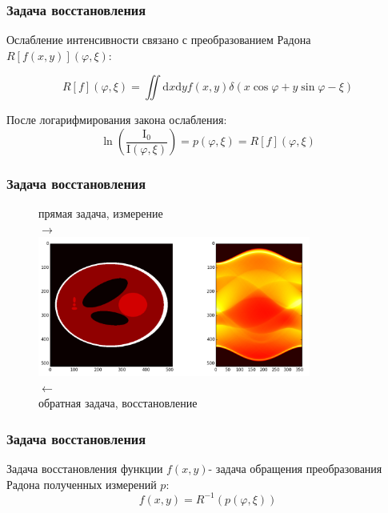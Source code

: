 \documentclass[12pt]{beamer}
\begin{document}
\begin{frame}
\frametitle{Задача восстановления}
  Ослабление интенсивности связано с преобразованием Радона $R[f(x,y)](\varphi, \xi)$:

  $$
  R[f](\varphi, \xi) = 
 \iint \! \mathrm d x \mathrm d y f(x,y)\delta(x\cos\varphi + y\sin\varphi - \xi)
  $$


  После логарифмирования закона ослабления:
  $$
  \ln \left (\frac{\mathrm I_0}{\mathrm I(\varphi, \xi)} \right) = p(\varphi, \xi) = R[f](\varphi, \xi)
  $$

\end{frame}

\begin{frame}
\frametitle{Задача восстановления}
\begin{figure}
\centering
    прямая задача, измерение\\
    $\rightarrow$
    \\
    \includegraphics[width=0.8\textwidth]{sl_sinogram}
    \\
    $\leftarrow$ \\
    обратная задача, восстановление
\end{figure}
\end{frame}

\begin{frame}
\frametitle{Задача восстановления}

Задача восстановления функции $f(x,y)$- задача обращения преобразования Радона полученных измерений $p$:
$$
f(x,y) = R^{-1}(p(\varphi, \xi))
$$
\end{frame}
\end{document}
